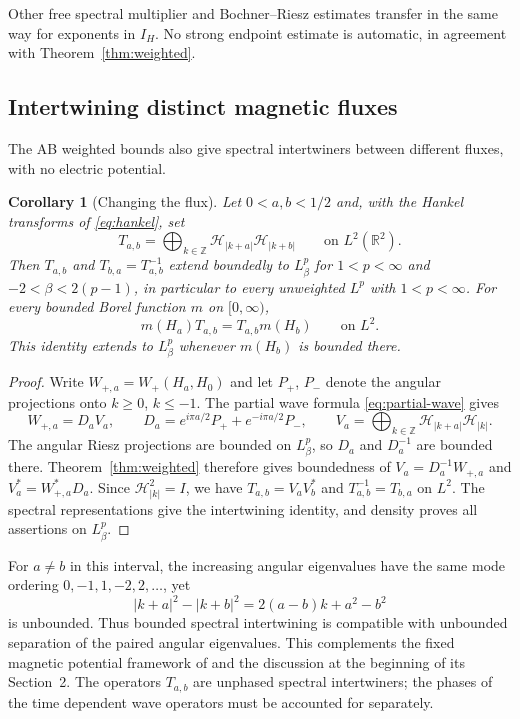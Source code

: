\documentclass[11pt,a4paper,reqno,backref=page]{amsart}
\newcommand{\R}{\mathbb R}
\newcommand{\Z}{\mathbb Z}
\newcommand{\HH}{\mathcal H}                 %
\numberwithin{equation}{section}
\newtheorem{corollary}[theorem]{Corollary}
\theoremstyle{definition}
\theoremstyle{remark}
\begin{document}
Other free spectral multiplier and Bochner--Riesz estimates
transfer in the same way for exponents in $I_H$. No strong
endpoint estimate is automatic, in agreement with
Theorem~\ref{thm:weighted}.

\subsection{Intertwining distinct magnetic fluxes}

The AB weighted bounds also give spectral intertwiners
between different fluxes, with no electric potential.

\begin{corollary}[Changing the flux]\label{cor:change-flux}
Let $0<a,b<1/2$ and, with the Hankel transforms of
\eqref{eq:hankel}, set
\begin{equation}\label{eq:change-flux}
  T_{a,b}=\bigoplus_{k\in\Z}\HH_{|k+a|}\HH_{|k+b|}
  \qquad\text{on }L^2(\R^2).
\end{equation}
Then $T_{a,b}$ and $T_{b,a}=T_{a,b}^{-1}$ extend boundedly to
$L^p_\beta$ for $1<p<\infty$ and $-2<\beta<2(p-1)$, in
particular to every unweighted $L^p$ with $1<p<\infty$. For
every bounded Borel function $m$ on $[0,\infty)$,
\begin{equation*}
  m(H_a)T_{a,b}=T_{a,b}m(H_b)\qquad\text{on }L^2.
\end{equation*}
This identity extends to $L^p_\beta$ whenever $m(H_b)$ is
bounded there.
\end{corollary}

\begin{proof}
Write $W_{+,a}=W_+(H_a,H_0)$ and let $P_+$, $P_-$ denote the
angular projections onto $k\ge0$, $k\le-1$. The partial wave
formula \eqref{eq:partial-wave} gives
\begin{equation*}
  W_{+,a}=D_aV_a,\qquad
  D_a=e^{i\pi a/2}P_++e^{-i\pi a/2}P_-,\qquad
  V_a=\bigoplus_{k\in\Z}\HH_{|k+a|}\HH_{|k|}.
\end{equation*}
The angular Riesz projections are bounded on $L^p_\beta$, so
$D_a$ and $D_a^{-1}$ are bounded there.
Theorem~\ref{thm:weighted} therefore gives boundedness of
$V_a=D_a^{-1}W_{+,a}$ and $V_a^*=W_{+,a}^*D_a$. Since
$\HH_{|k|}^2=I$, we have $T_{a,b}=V_aV_b^*$ and
$T_{a,b}^{-1}=T_{b,a}$ on $L^2$. The spectral representations
give the intertwining identity, and density proves all
assertions on $L^p_\beta$.
\end{proof}

For $a\ne b$ in this interval, the increasing angular
eigenvalues have the same mode ordering $0,-1,1,-2,2,\ldots$,
yet
\begin{equation*}
  |k+a|^2-|k+b|^2=2(a-b)k+a^2-b^2
\end{equation*}
is unbounded. Thus bounded spectral intertwining is compatible
with unbounded separation of the paired angular eigenvalues.
This complements the fixed magnetic potential framework of
\cite{FSWZZ2026} and the discussion at the beginning of its
Section~2. The operators $T_{a,b}$ are unphased spectral
intertwiners; the phases of the time dependent wave operators
must be accounted for separately.
\end{document}
